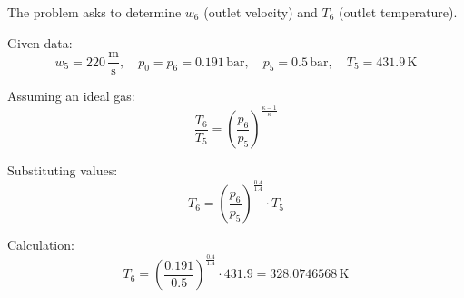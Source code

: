 The problem asks to determine \( w_6 \) (outlet velocity) and \( T_6 \) (outlet temperature).  

Given data:  
\[
w_5 = 220 \, \frac{\text{m}}{\text{s}}, \quad p_0 = p_6 = 0.191 \, \text{bar}, \quad p_5 = 0.5 \, \text{bar}, \quad T_5 = 431.9 \, \text{K}
\]

Assuming an ideal gas:  
\[
\frac{T_6}{T_5} = \left( \frac{p_6}{p_5} \right)^{\frac{\kappa - 1}{\kappa}}
\]

Substituting values:  
\[
T_6 = \left( \frac{p_6}{p_5} \right)^{\frac{0.4}{1.4}} \cdot T_5
\]

Calculation:  
\[
T_6 = \left( \frac{0.191}{0.5} \right)^{\frac{0.4}{1.4}} \cdot 431.9 = 328.0746568 \, \text{K}
\]